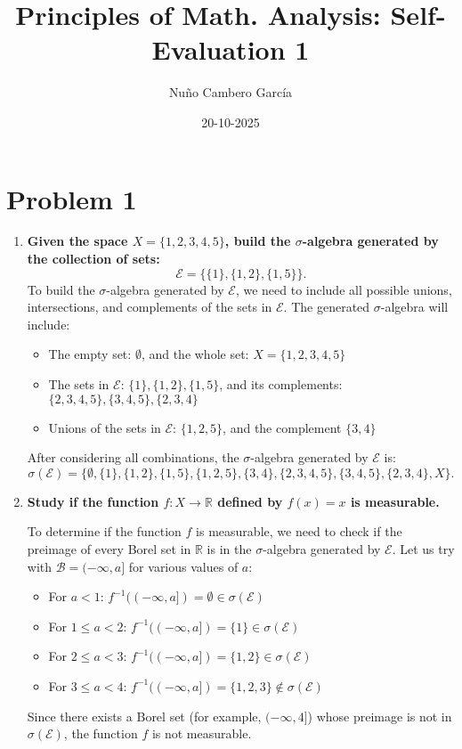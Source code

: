 \documentclass[11pt]{article}
\title{\textbf{Principles of Math. Analysis: Self-Evaluation 1}}
\author{Nuño Cambero García}
\date{20-10-2025}
\begin{document}
\maketitle

\section*{Problem 1}
\begin{enumerate} [label = \alph*)]
    \item \textbf{\large Given the space \(X = \{1, 2, 3, 4, 5\}\), build the \(\sigma\)-algebra generated by the collection of sets:
        \[\mathcal{E} = \{\{1\}, \{1, 2\}, \{1, 5\}\}.\]}
        To build the \(\sigma\)-algebra generated by \(\mathcal{E}\), we need to include all possible unions, intersections, and complements of the sets in \(\mathcal{E}\). The generated \(\sigma\)-algebra will include:
        \begin{itemize}
            \item The empty set: \(\emptyset\), and the whole set: \(X = \{1, 2, 3, 4, 5\}\)
            \item The sets in \(\mathcal{E}\): \(\{1\}, \{1, 2\}, \{1, 5\}\), and its complements: \(\{2, 3, 4, 5\}, \{3, 4, 5\}, \{2, 3, 4\}\)
            \item Unions of the sets in \(\mathcal{E}\): \(\{1, 2, 5\}\), and the complement \(\{3, 4\}\)
        \end{itemize}
        After considering all combinations, the \(\sigma\)-algebra generated by \(\mathcal{E}\) is:
        \[\sigma (\mathcal{E}) = \{\emptyset, \{1\}, \{1, 2\}, \{1, 5\}, \{1, 2, 5\}, \{3, 4\}, \{2, 3, 4, 5\}, \{3, 4, 5\}, \{2, 3, 4\}, X\}.\]
    \item \textbf{\large Study if the function \(f : X \to \mathbb{R}\) defined by \(f(x) = x\) is measurable.}

        To determine if the function \(f\) is measurable, we need to check if the preimage of every Borel set in \(\mathbb{R}\) is in the \(\sigma\)-algebra generated by \(\mathcal{E}\). Let us try with \(\mathcal{B} = (-\infty, a]\) for various values of \(a\):
        \begin{itemize}
            \item For \(a < 1\): \(f^{-1}((-\infty, a]) = \emptyset \in \sigma(\mathcal{E})\)
            \item For \(1 \leq a < 2\): \(f^{-1}((-\infty, a]) = \{1\} \in \sigma(\mathcal{E})\)
            \item For \(2 \leq a < 3\): \(f^{-1}((-\infty, a]) = \{1, 2\} \in \sigma(\mathcal{E})\)
            \item For \(3 \leq a < 4\): \(f^{-1}((-\infty, a]) = \{1, 2, 3\} \notin \sigma(\mathcal{E})\)
        \end{itemize}
        Since there exists a Borel set (for example, \((-\infty, 4]\)) whose preimage is not in \(\sigma(\mathcal{E})\), the function \(f\) is not measurable.


\end{enumerate}
\end{document}
